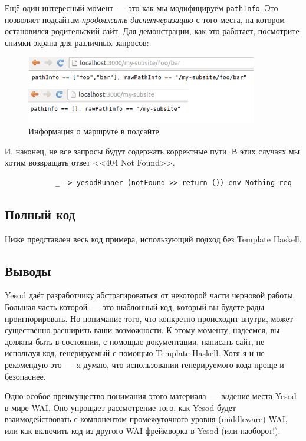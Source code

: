 Ещё один интересный момент~--- это как мы модифицируем \lstinline'pathInfo'.
Это позволяет подсайтам \emph{продолжить диспетчеризацию} с того места, на
котором остановился родительский сайт. Для демонстрации, как это работает,
посмотрите снимки экрана для различных запросов:
\begin{figure}[h!]
  \centering
  \includegraphics[width=0.9\textwidth]{understanding-request/subsite-path-info.png}
  \caption{Информация о маршруте в подсайте}
\end{figure}

И, наконец, не все запросы будут содержать корректные пути. В этих случаях мы
хотим возвращать ответ <<404 Not Found>>.
\begin{lstlisting}
            _ -> yesodRunner (notFound >> return ()) env Nothing req
\end{lstlisting}

\subsection{Полный код}
Ниже представлен весь код примера, использующий подход без Template Haskell.


\subsection{Выводы}
Yesod даёт разработчику абстрагироваться от некоторой части черновой работы.
Большая часть которой~--- это шаблонный код, который вы будете рады
проигнорировать. Но понимание того, что конкретно происходит внутри, может
существенно расширить ваши возможности. К этому моменту, надеемся, вы должны
быть в состоянии, с помощью документации, написать сайт, не используя код,
генерируемый с помощью Template Haskell. Хотя я и не рекомендую это~--- я
думаю, что использовании генерируемого кода проще и безопаснее.

Одно особое преимущество понимания этого материала~--- в\emph{и}дение места
Yesod в мире WAI. Оно упрощает рассмотрение того, как Yesod будет
взаимодействовать с компонентом промежуточного уровня (middleware) WAI, или как
включить код из другого WAI фреймворка в Yesod (или наоборот!).
